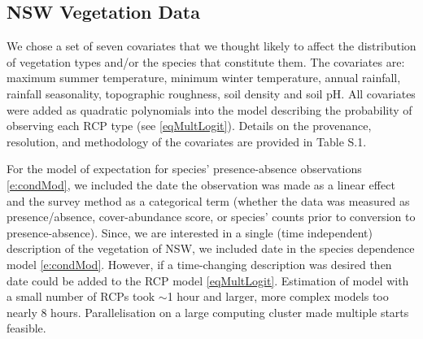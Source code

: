 \documentclass{statsoc}
\begin{document}
\subsection{NSW Vegetation Data} \label{SectVegAnal}

We chose a set of seven covariates that we thought likely to affect the distribution of vegetation types and/or the species that constitute them. The covariates are: maximum summer temperature, minimum winter temperature, annual rainfall, rainfall seasonality, topographic roughness, soil density and soil pH. All covariates were added as quadratic polynomials into the model describing the probability of observing each RCP type (see \ref{eqMultLogit}). Details on the provenance, resolution, and methodology of the covariates are provided in Table S.1.

For the model of expectation for species' presence-absence observations \eqref{e:condMod}, we included the date the observation was made as a linear effect and the survey method as a categorical term (whether the data was measured as presence/absence, cover-abundance score, or species' counts prior to conversion to presence-absence). Since, we are interested in a single (time independent) description of the vegetation of NSW, we included date in the species dependence model \eqref{e:condMod}. However, if a time-changing description was desired then date could be added to the RCP model \eqref{eqMultLogit}. Estimation of model with a small number of RCPs took $\sim$1 hour and larger, more complex models too nearly 8 hours. Parallelisation on a large computing cluster made multiple starts feasible.%
\end{document}
